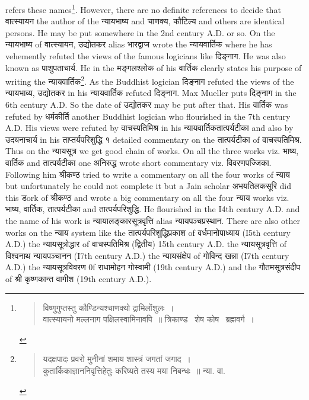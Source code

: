 \documentclass[11pt, openany]{book}
\begin{document}
\newpage
\noindent
refers these names\renewcommand{\thefootnote}{1}\footnote{\vspace{-3mm} \begin{quote}
{\qt विष्णुगुप्तस्तु कौण्डिन्यश्चाणक्यो द्रामिलोंशुलः~।\\
वात्स्यायनो मल्लनाग पक्षिलस्वामिनावपि~॥} त्रिकाण्ड \textendash\ शेष कोष \textendash\ ब्रह्मवर्ग~।
\end{quote}}. However, there are no definite references to decide that वात्स्यायन the author of the न्यायभाष्य and चाणक्य, कौटिल्य and others are identical persons. He may be put somewhere in the 2nd century A.D. or so. On the न्यायभाष्य of वात्स्यायन, उद्योतकर alias भारद्वाज wrote the न्यायवार्तिक where he has vehemently refuted the views of the famous logicians like दिङ्नाग. He was also known as पाशुपताचार्य. He in the मङ्गलश्लोक of his वार्तिक clearly states his purpose of writing the न्यायवार्तिक\renewcommand{\thefootnote}{2}\footnote{\vspace{-3mm} \begin{quote}
{\qt यदक्षपादः प्रवरो मुनीनां शमाय शास्त्रं जगतां जगाद~।\\
कुतार्किकाज्ञाननिवृत्तिहेतुः करिष्यते तस्य मया निबन्धः~॥} न्या. वा.
\end{quote}}. As the Buddhist logician दिङ्नाग refuted the views of the न्यायभाव्य, उद्योतकर in his न्यायवार्तिक refuted दिङ्नाग. Max Mueller puts दिङ्नाग in the 6th century A.D. So the date of उद्योतकर may be put after that. His वार्तिक was refuted by धर्मकीर्ति another Buddhist logician who flourished in the 7th century A.D. His views were refuted by वाचस्पतिमिश्र in his न्यायवार्तिकतात्पर्यटीका and also by उदयनाचार्य in his ताप्तर्यपरिशुद्धि १ detailed commentary on the तात्पर्यटीका of वाचस्पतिमिश्र. Thus on the न्यायसूत्र we get good chain of works. On all the three works viz. भाष्य, वार्तिक and तात्पर्यटीका one अनिरुद्ध wrote short commentary viz. विवरणपज्जिका. Following him श्रीकण्ठ tried to write a commentary on all the four works of न्याय but unfortunately he could not complete it but a Jain scholar अभयतिलकसूरि did this डork of श्रीकण्ठ and wrote a big commentary on all the four न्याय works viz. भाष्य, वार्तिक, तात्पर्यटीका and तात्पर्यपरिशुद्धि. He flourished in the I4th century A.D. and the name of his work is न्यायालङ्कारसूत्रवृत्ति alias न्यायपञ्चप्रस्थान. There are also other works on the न्याय system like the तात्पर्यपरिशुद्धिप्रकाश of वर्धमानोपाध्याय (I5th century A.D.) the न्यायसूत्रोद्धार of वाचस्पतिमिश्र (द्वितीय) 15th century A.D. the न्यायसूत्रवृत्ति of विश्वनाथ न्यायपञ्चानन (I7th century A.D.) the न्यायसंक्षेप of गोविन्द खन्ना (I7th century A.D.) the न्यायसूत्रविवरण 0f राधामोहन गोस्वामी (19th century A.D.) and the गौतमसूत्रसंदीप of श्री कृष्णकान्त वागीश (19th century A.D.).
\end{document}
